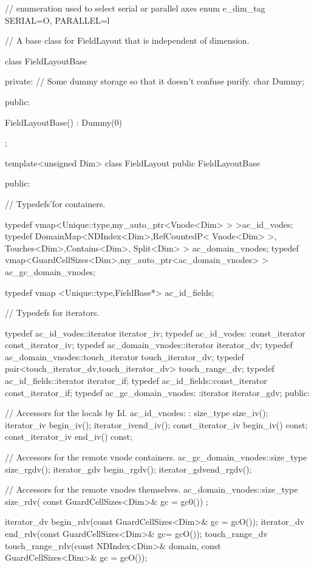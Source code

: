 \begin{smallcode}
// enumeration used to select serial or parallel axes 
enum e_dim_tag { SERIAL=O, PARALLEL=l } 

// A base class for FieldLayout that is independent of dimension. 

class FieldLayoutBase 
{ 
private: 
// Some dummy storage so that it doesn't confuse purify. 
char Dummy; 

public: 

FieldLayoutBase() : Dummy(0) {} 	
};

template<unsigned Dim>
class FieldLayout public FieldLayoutBase { 
public: 

// Typedefs'for containers. 

typedef vmap<Unique::type,my_auto_ptr<Vnode<Dim> > >ac_id_vodes;
typedef DomainMap<NDIndex<Dim>,RefCountedP< Vnode<Dim> >,
                                       Touches<Dim>,Contains<Dim>,
                                       Split<Dim> > ac_domain_vnodes;
typedef vmap<GuardCellSizes<Dim>,my_auto_ptr<ac_domain_vnodes> > 
	     ac_gc_domain_vnodes; 

typedef vmap <Unique::type,FieldBase*> ac_id_fields;

// Typedefs for iterators. 

typedef ac_id_vodes::iterator iterator_iv;
typedef ac_id_vodes: :const_iterator const_iterator_iv; 
typedef ac_domain_vnodes::iterator iterator_dv; 
typedef ac_domain_vnodes::touch_iterator touch_iterator_dv; 
typedef pair<touch_iterator_dv,touch_iterator_dv> touch_range_dv; 
typedef ac_id_fields::iterator iterator_if;
typedef ac_id_fields::const_iterator const_iterator_if; 
typedef ac_gc_domain_vnodes: :iterator iterator_gdv; 
public: 

// Accessors for the locals by Id. 
ac_id_vnodes: : size_type size_iv(); 
iterator_iv begin_iv(); 
iterator_ivend_iv(); 
const_iterator_iv begin_iv() const; 
const_iterator_iv end_iv() const; 

// Accessors for the remote vnode containers. 
ac_gc_domain_vnodes::size_type size_rgdv(); 
iterator_gdv begin_rgdv(); 
iterator_gdvend_rgdv(); 

// Accessors for the remote vnodes themselves. 
ac_domain_vnodes::size_type size_rdv( const GuardCellSizes<Dim>& gc = gc0()) ;
 
iterator_dv begin_rdv(const GuardCellSizes<Dim>& gc = gcO()); 
iterator_dv end_rdv(const GuardCellSizes<Dim>& gc= gcO()); 
touch_range_dv touch_range_rdv(const NDIndex<Dim>& domain, 
		const GuardCellSizes<Dim>& gc = gcO()); 

}
\end{smallcode}
